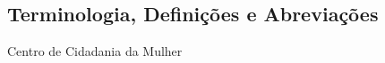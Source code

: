 {\begin{center}
		\section*{\normalsize{Terminologia, Definições e Abreviações}}
		
		\begin{description}
			\vspace*{1cm}
			\item[CCM] Centro de Cidadania da Mulher
		\end{description}			
\end{center}}	
\newpage

